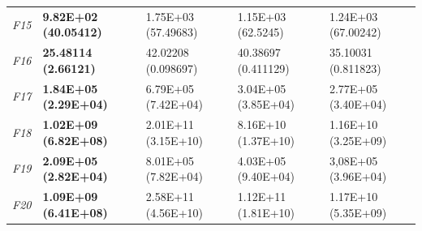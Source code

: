 \begin{table}[!h]
\begin{center}
\begin{tabular}{p{0.5cm}|p{2.5cm}|p{2.5cm}|p{2.5cm}|p{2.5cm}}
\textit{F15} & \textbf{9.82E+02 (40.05412)} & 1.75E+03 (57.49683) & 1.15E+03 (62.5245) & 1.24E+03 (67.00242)\\
\textit{F16} & \textbf{25.48114 (2.66121)} & 42.02208 (0.098697) & 40.38697 (0.411129) & 35.10031 (0.811823)\\
\textit{F17} & \textbf{1.84E+05 (2.29E+04)} & 6.79E+05 (7.42E+04) & 3.04E+05 (3.85E+04) & 2.77E+05 (3.40E+04)\\
\textit{F18} & \textbf{1.02E+09 (6.82E+08)} & 2.01E+11 (3.15E+10) & 8.16E+10 (1.37E+10) & 1.16E+10 (3.25E+09)\\
\textit{F19} & \textbf{2.09E+05 (2.82E+04)} & 8.01E+05 (7.82E+04) & 4.03E+05 (9.40E+04) & 3,08E+05 (3.96E+04)\\
\textit{F20} & \textbf{1.09E+09 (6.41E+08)} & 2.58E+11 (4.56E+10) & 1.12E+11 (1.81E+10) & 1.17E+10 (5.35E+09)\\
\hline
\end{tabular}
\end{center}
\end{table}

